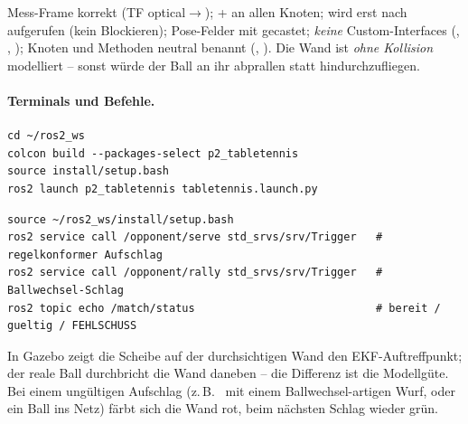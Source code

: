 \begin{infobox}[title={Checkliste 23.5/24.6 -- in Schritt 5 beachtet}]
Mess-Frame korrekt (TF optical$\rightarrow$);  +
 an allen Knoten;  wird erst nach
 aufgerufen (kein Blockieren); Pose-Felder mit
 gecastet; \emph{keine} Custom-Interfaces (,
, ); Knoten und
Methoden neutral benannt (, ).
Die Wand ist \emph{ohne Kollision} modelliert -- sonst würde der Ball an ihr
abprallen statt hindurchzufliegen.
\end{infobox}

\paragraph{Terminals und Befehle.}
\begin{lstlisting}[style=bash,caption={Terminal 1 -- alles starten (jetzt mit Schiedsrichter + Wand)}]
cd ~/ros2_ws
colcon build --packages-select p2_tabletennis
source install/setup.bash
ros2 launch p2_tabletennis tabletennis.launch.py
\end{lstlisting}
\begin{lstlisting}[style=bash,caption={Terminal 2 -- Aufschlag/Ballwechsel auslösen, Verdikt mitlesen}]
source ~/ros2_ws/install/setup.bash
ros2 service call /opponent/serve std_srvs/srv/Trigger   # regelkonformer Aufschlag
ros2 service call /opponent/rally std_srvs/srv/Trigger   # Ballwechsel-Schlag
ros2 topic echo /match/status                            # bereit / gueltig / FEHLSCHUSS
\end{lstlisting}
\noindent In Gazebo zeigt die Scheibe auf der durchsichtigen Wand den
EKF-Auftreffpunkt; der reale Ball durchbricht die Wand daneben -- die Differenz ist
die Modellgüte. Bei einem ungültigen Aufschlag (z.\,B.\  mit
einem Ballwechsel-artigen Wurf, oder ein Ball ins Netz) färbt sich die Wand rot,
beim nächsten Schlag wieder grün.

